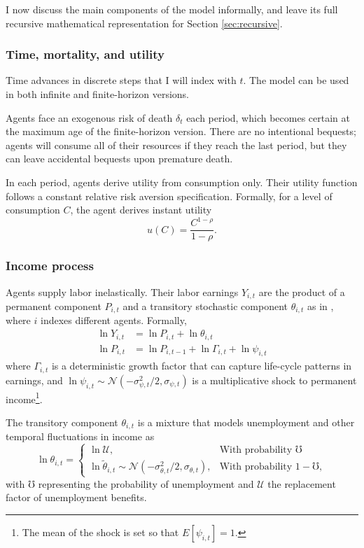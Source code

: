\documentclass[./RiskyContrib.tex]{subfiles}
\begin{document}
I now discuss the main components of the model informally, and leave its full
recursive mathematical representation for Section \ref{sec:recursive}.

\subsubsection{Time, mortality, and utility}

Time advances in discrete steps that I will index with $t$. The model can
be used in both infinite and finite-horizon versions.

Agents face an exogenous risk of death $\delta_t$ each period, which becomes certain at the 
maximum age of the finite-horizon version. There are no intentional bequests; agents
will consume all of their resources if they reach the last period, but they can leave
accidental bequests upon premature death.

In each period, agents derive utility from consumption only. Their utility function
follows a constant relative risk aversion specification. Formally, for a level of 
consumption $C$, the agent derives instant utility
\begin{equation}
	u(C) = \frac{C^{1-\rho}}{1- \rho}.
\end{equation}

\subsubsection{Income process}

Agents supply labor inelastically. Their labor earnings $Y_{i,t}$ are the product of a
permanent component $P_{i,t}$ and a transitory stochastic component $\theta_{i,t}$ as
in \cite{Carroll1997qje},  where $i$ indexes different agents. Formally,
\begin{equation*}
\begin{split}
\ln Y_{i,t} &= \ln P_{i,t} + \ln \theta_{i,t} \\
\ln P_{i,t} &= \ln P_{i,t-1} + \ln \Gamma_{i,t} + \ln \psi_{i,t}
\end{split}
\end{equation*}
where $\Gamma_{i,t}$ is a deterministic growth factor that can capture
life-cycle patterns in earnings, and
$\ln \psi_{i,t}\sim \mathcal{N}(-\sigma^2_{\psi,t}/2, \sigma_{\psi,t})$
is a multiplicative shock to permanent income\footnote{The mean of the shock is set so that $E[\psi_{i,t}] = 1$.}.

The transitory component $\theta_{i,t}$ is a mixture that models unemployment and
other temporal fluctuations in income as
\begin{equation*}
\ln\theta_{i,t} = \begin{cases}
\ln \mathcal{U}, & \text{With probability } \mho\\
\ln \tilde{\theta}_{i,t}\sim\mathcal{N}(-\sigma^2_{\theta,t}/2, \sigma_{\theta,t}), & \text{With probability } 1-\mho,
\end{cases}
\end{equation*}
with $\mho$ representing the probability of unemployment and $\mathcal{U}$ the replacement
factor of unemployment benefits.
\end{document}
